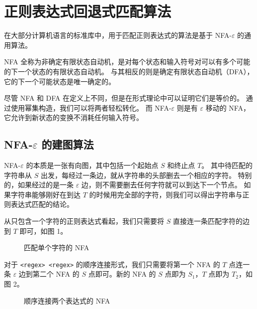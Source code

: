 \documentclass[hyperref,UTF8,12pt,a4paper]{ctexart}
\begin{document}
\section{正则表达式回退式匹配算法}

在大部分计算机语言的标准库中，用于匹配正则表达式的算法是基于 NFA-$\varepsilon$ 的通用算法。

NFA 全称为非确定有限状态自动机，是对每个状态和输入符号对可以有多个可能的下一个状态的有限状态自动机。
与其相反的则是确定有限状态自动机（DFA），它的下一个可能状态是唯一确定的。

尽管 NFA 和 DFA 在定义上不同，但是在形式理论中可以证明它们是等价的。
通过使用幂集构造，我们可以将两者轻松转化。
而 NFA-$\varepsilon$ 则是有 $\varepsilon$ 移动的 NFA，它允许到新状态的变换不消耗任何输入符号。

\subsection{NFA-$\varepsilon$ 的建图算法}

NFA-$\varepsilon$ 的本质是一张有向图，其中包括一个起始点 $S$ 和终止点 $T$。
其中待匹配的字符串从 $S$ 出发，每经过一条边，就从字符串的头部删去一个相应的字符。
特别的，如果经过的是一条 $\varepsilon$ 边，则不需要删去任何字符就可以到达下一个节点。
如果字符串能够刚好在到达 $T$ 的时候用完全部的字符，则我们可以得出字符串与正则表达式匹配的结论。

从只包含一个字符的正则表达式看起，我们只需要将 $S$ 直接连一条匹配字符的边到 $T$ 即可，如图 1。

\begin{figure}[h]
	\centering
	\caption{匹配单个字符的 NFA}
\end{figure}

对于 \verb!<regex> <regex>! 的顺序连接形式，我们只需要将第一个 NFA 的 $T$ 点连一条 $\varepsilon$ 边到第二个 NFA 的 $S$ 点即可。新的 NFA 的 $S$ 点即为 $S_1$，$T$ 点即为 $T_2$，如图 2。

\begin{figure}[h]
	\centering
	\caption{顺序连接两个表达式的 NFA}
\end{figure}
\end{document}

